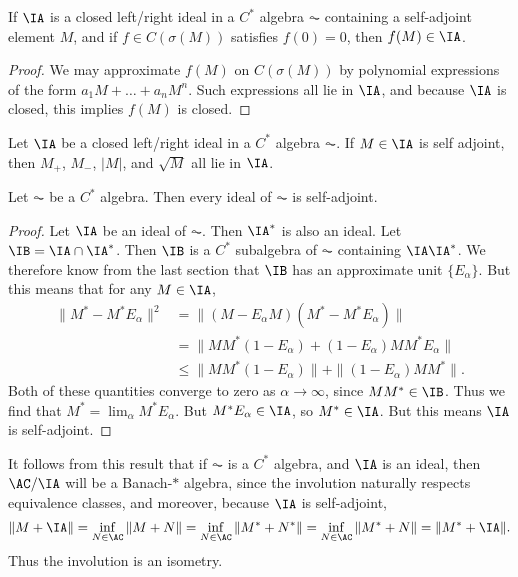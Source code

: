 \begin{lemma}
    If $\IA$ is a closed left/right ideal in a $C^*$ algebra $\AC$ containing a self-adjoint element $M$, and if $f \in C(\sigma(M))$ satisfies $f(0) = 0$, then $f(M) \in \IA$.
\end{lemma}
\begin{proof}
    We may approximate $f(M)$ on $C(\sigma(M))$ by polynomial expressions of the form $a_1 M + \dots + a_n M^n$. Such expressions all lie in $\IA$, and because $\IA$ is closed, this implies $f(M)$ is closed.
\end{proof}

\begin{corollary}
    Let $\IA$ be a closed left/right ideal in a $C^*$ algebra $\AC$. If $M \in \IA$ is self adjoint, then $M_+$, $M_-$, $|M|$, and $\sqrt{M}$ all lie in $\IA$.
\end{corollary}

\begin{lemma}
    Let $\AC$ be a $C^*$ algebra. Then every ideal of $\AC$ is self-adjoint.
\end{lemma}
\begin{proof}
    Let $\IA$ be an ideal of $\AC$. Then $\IA^*$ is also an ideal. Let $\IB = \IA \cap \IA^*$. Then $\IB$ is a $C^*$ subalgebra of $\AC$ containing $\IA \IA^*$. We therefore know from the last section that $\IB$ has an approximate unit $\{ E_\alpha \}$. But this means that for any $M \in \IA$,
    \begin{align*}
        \| M^* - M^* E_\alpha \|^2 &= \| (M - E_\alpha M) (M^* - M^* E_\alpha) \|\\
        &= \| MM^*(1 - E_\alpha) + (1 - E_\alpha) MM^* E_\alpha \|\\
        &\leq \| MM^* (1 - E_\alpha) \| + \| (1 - E_\alpha) MM^* \|.
    \end{align*}
    Both of these quantities converge to zero as $\alpha \to \infty$, since $MM^* \in \IB$. Thus we find that $M^* = \lim_\alpha M^* E_\alpha$. But $M^* E_\alpha \in \IA$, so $M^* \in \IA$. But this means $\IA$ is self-adjoint.
\end{proof}

It follows from this result that if $\AC$ is a $C^*$ algebra, and $\IA$ is an ideal, then $\AC / \IA$ will be a Banach-$*$ algebra, since the involution naturally respects equivalence classes, and moreover, because $\IA$ is self-adjoint,
%
\[ \| M + \IA \| = \inf_{N \in \AC} \| M + N \| = \inf_{N \in \AC} \| M^* + N^* \| = \inf_{N \in \AC} \| M^* + N \| = \| M^* + \IA \|. \]
%
Thus the involution is an isometry.

